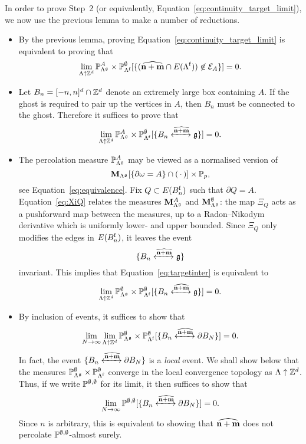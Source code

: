 In order to prove Step~2 (or equivalently, Equation~\eqref{eq:continuity_target_limit}),
we now use the previous lemma to make a number of reductions.
\begin{itemize}
    \item By the previous lemma,
    proving Equation~\eqref{eq:continuity_target_limit} is equivalent to proving that 
    \[
        \lim_{\Lambda\uparrow\Z^d}
        \P_{\Lambda^\frakg}^A\times\P_{\Lambda^\f}^\emptyset
            [\{(\widehat{\n+\m}\cap E(\Lambda^\f))\not\in\calE_A\}]=0.
    \]
    \item Let $B_n=[-n,n]^d\cap \Z^d$ denote an extremely large box
    containing $A$.
    If the ghost is required to pair up the vertices in $A$,
    then $B_n$ must be connected to the ghost.
    Therefore it suffices to prove that
    \begin{equation}
        \label{eq:targetinter}
        \lim_{\Lambda\uparrow\Z^d}
        \P_{\Lambda^\frakg}^A\times\P_{\Lambda^\f}^\emptyset
            [\{B_n \xleftrightarrow{\widehat{\n+\m}}\frakg\}]=0.
    \end{equation}
    \item The percolation measure $\P_{\Lambda^\frakg}^A$ may be viewed
    as a normalised version of \[\bfM_{\Lambda^\frakg}[\{\partial\omega=A\}\cap(\blank)]\times \P_p,\] see Equation~\eqref{eq:equivalence}.
    Fix $Q\subset E(B_n^\f)$ such that $\partial Q=A$.
    Equation~\eqref{eq:XiQ} relates the measures $\bfM_{\Lambda^\frakg}^A$
    and $\bfM_{\Lambda^\frakg}^\emptyset$:
    the map $\Xi_Q$ acts as a pushforward map
    between the measures, up to a Radon--Nikodym derivative which is uniformly
    lower- and upper bounded.
    Since $\Xi_Q$ only modifies the edges in $E(B_n^\f)$, it leaves the event \[\{B_n \xleftrightarrow{\widehat{\n+\m}}\frakg\}\] invariant.
    This implies that Equation~\eqref{eq:targetinter} is equivalent to 
    \begin{equation}
        \lim_{\Lambda\uparrow\Z^d}
        \P_{\Lambda^\frakg}^\emptyset\times\P_{\Lambda^\f}^\emptyset
            [\{B_n \xleftrightarrow{\widehat{\n+\m}}\frakg\}]=0.
    \end{equation}
    \item 
    By inclusion of events, it suffices to show that
    \begin{equation}
        \lim_{N\to\infty}\lim_{\Lambda\uparrow\Z^d}
        \P_{\Lambda^\frakg}^\emptyset\times\P_{\Lambda^\f}^\emptyset
            [\{B_n \xleftrightarrow{\widehat{\n+\m}}\partial B_N\}]=0.
    \end{equation}
    In fact, the event $\{B_n \xleftrightarrow{\widehat{\n+\m}}\partial B_N\}$
    is a \emph{local} event.
    We shall show below that the measures $\P_{\Lambda^\frakg}^\emptyset\times\P_{\Lambda^\f}^\emptyset$
    converge in the local convergence topology as $\Lambda\uparrow\Z^d$.
    Thus, if we write $\P^{\emptyset,\emptyset}$ for its limit, it then suffices
    to show that
    \[
        \lim_{N\to\infty}\P^{\emptyset,\emptyset}
            [\{B_n \xleftrightarrow{\widehat{\n+\m}}\partial B_N\}]=0.
    \]
    Since $n$ is arbitrary, this is equivalent to showing
    that $\widehat{\n+\m}$ does not percolate $\P^{\emptyset,\emptyset}$-almost surely.
\end{itemize}
 
